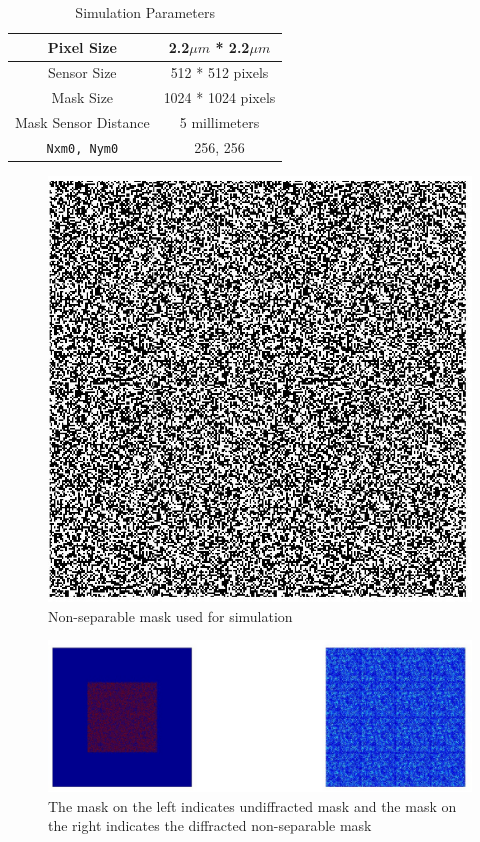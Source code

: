 \begin{table}
\caption{Simulation Parameters}
\begin{center}
\begin{tabular}{ |c|c| }
\hline
Pixel Size & 2.2$\mu m$ * 2.2$\mu m$\\
\hline
Sensor Size & 512 * 512 pixels\\
\hline     
Mask Size & 1024 * 1024 pixels\\
\hline 
Mask Sensor Distance & 5 millimeters \\
\hline 
\texttt{Nxm0, Nym0} & 256, 256\\
\hline
\end{tabular}
\label{tbl:sim_parameters}
\end{center}
\end{table}

\begin{figure}[ht]
\centering
\includegraphics[scale = 0.250]{pics/non_separable_mask}
\caption{Non-separable mask used for simulation}
\label{fig:non_sep_sim}
\end{figure}

\begin{figure}[ht]
\centering
\includegraphics[width = \textwidth]{pics/non_sep_diffracted_mask}
\caption{The mask on the left indicates undiffracted mask and the mask on the right indicates the diffracted non-separable mask}
\label{fig:non_sep_sim_diff}
\end{figure}

